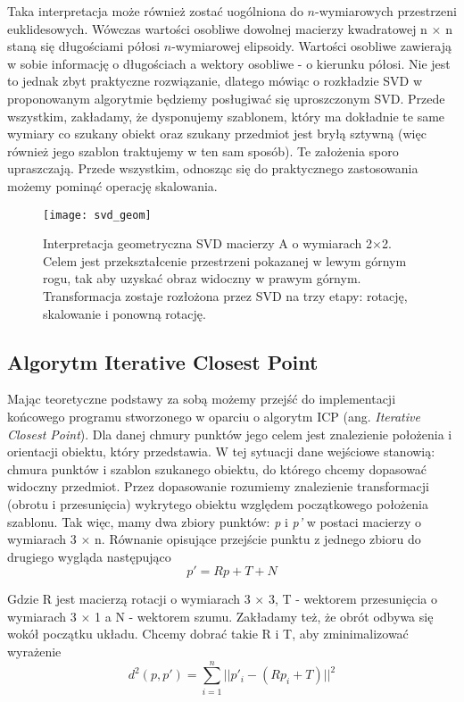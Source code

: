 \documentclass[12pt]{article}
\begin{document}
Taka interpretacja może również zostać uogólniona do $n$-wymiarowych przestrzeni euklidesowych. Wówczas wartości osobliwe dowolnej macierzy kwadratowej n $\times$ n staną się długościami półosi $n$-wymiarowej elipsoidy. Wartości osobliwe zawierają w sobie informację o długościach a wektory osobliwe - o kierunku półosi. Nie jest to jednak zbyt praktyczne rozwiązanie, dlatego mówiąc o rozkładzie SVD w proponowanym algorytmie będziemy posługiwać się uproszczonym SVD. Przede wszystkim, zakładamy, że dysponujemy szablonem, który ma dokładnie te same wymiary co szukany obiekt oraz szukany przedmiot jest bryłą sztywną (więc również jego szablon traktujemy w ten sam sposób). Te założenia sporo upraszczają. Przede wszystkim, odnosząc się do praktycznego zastosowania możemy pominąć operację skalowania.

\begin{figure}[h]
\centering
\texttt{[image: svd\_geom]}
\caption{Interpretacja geometryczna SVD macierzy A o wymiarach 2$\times$2. Celem jest przekształcenie przestrzeni pokazanej w lewym górnym rogu, tak aby uzyskać obraz widoczny w prawym górnym. Transformacja zostaje rozłożona przez SVD na trzy etapy: rotację, skalowanie i ponowną rotację.}
\end{figure}

\subsection{Algorytm Iterative Closest Point}
Mając teoretyczne podstawy za sobą możemy przejść do implementacji końcowego programu stworzonego w oparciu o algorytm ICP (ang. \emph{Iterative Closest Point}). Dla danej chmury punktów jego celem jest znalezienie położenia i orientacji obiektu, który przedstawia. W tej sytuacji dane wejściowe stanowią: chmura punktów i szablon szukanego obiektu, do którego chcemy dopasować widoczny przedmiot. Przez dopasowanie rozumiemy znalezienie transformacji (obrotu i przesunięcia) wykrytego obiektu względem początkowego położenia szablonu. Tak więc, mamy dwa zbiory punktów: \emph{p} i \emph{p'} w postaci macierzy o wymiarach 3 $\times$ n. Równanie opisujące przejście punktu z jednego zbioru do drugiego wygląda następująco
\[p' = R p + T + N \]

Gdzie R jest macierzą rotacji o wymiarach 3 $\times$ 3, T - wektorem przesunięcia o wymiarach 3 $\times$ 1 a N - wektorem szumu. Zakładamy też, że obrót odbywa się wokół początku układu. Chcemy dobrać takie R i T, aby zminimalizować wyrażenie
\[ d^2(p, p') = \sum_{i=1}^n || p'_{i} - (Rp_i+T)||^2 \]
\end{document}
